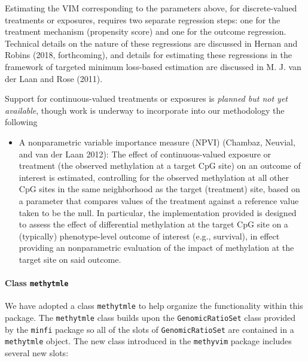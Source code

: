 \documentclass[9pt,a4paper,]{extarticle}
\theoremstyle{definition}
\theoremstyle{definition}
\theoremstyle{definition}
\theoremstyle{remark}
\begin{document}
Estimating the VIM corresponding to the parameters above, for
discrete-valued treatments or exposures, requires two separate
regression steps: one for the treatment mechanism (propensity score) and
one for the outcome regression. Technical details on the nature of these
regressions are discussed in Hernan and Robins (2018, forthcoming), and
details for estimating these regressions in the framework of targeted
minimum loss-based estimation are discussed in M. J. van der Laan and
Rose (2011).

Support for continuous-valued treatments or exposures is \emph{planned
but not yet available}, though work is underway to incorporate into our
methodology the following

\begin{itemize}
\item
  A nonparametric variable importance measure (NPVI) (Chambaz, Neuvial,
  and van der Laan 2012): The effect of continuous-valued exposure or
  treatment (the observed methylation at a target CpG site) on an
  outcome of interest is estimated, controlling for the observed
  methylation at all other CpG sites in the same neighborhood as the
  target (treatment) site, based on a parameter that compares values of
  the treatment against a reference value taken to be the null. In
  particular, the implementation provided is designed to assess the
  effect of differential methylation at the target CpG site on a
  (typically) phenotype-level outcome of interest (e.g., survival), in
  effect providing an nonparametric evaluation of the impact of
  methylation at the target site on said outcome.
\end{itemize}

\paragraph{\texorpdfstring{Class
\texttt{methytmle}}{Class methytmle}}\label{class-methytmle}

We have adopted a class \texttt{methytmle} to help organize the
functionality within this package. The \texttt{methytmle} class builds
upon the \texttt{GenomicRatioSet} class provided by the \texttt{minfi}
package so all of the slots of \texttt{GenomicRatioSet} are contained in
a \texttt{methytmle} object. The new class introduced in the
\texttt{methyvim} package includes several new slots:
\end{document}
